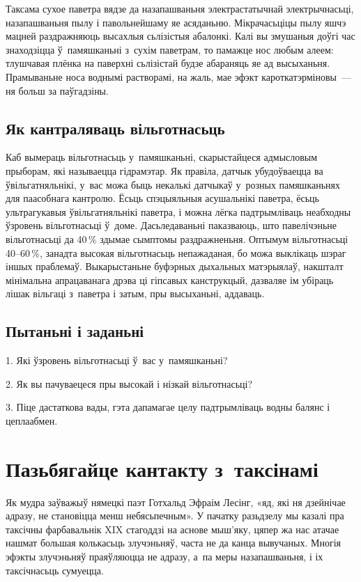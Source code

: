Таксама сухое паветра вядзе да назапашваньня электрастатычнай электрычнасьці, назапашваньня пылу і павольнейшаму яе асяданьню. Мікрачасьціцы пылу яшчэ мацней раздражняюць высахлыя сьлізістыя абалонкі. Калі вы змушаныя доўгі час знаходзіцца ў~памяшканьні з~сухім паветрам, то памажце нос любым алеем: тлушчавая плёнка на паверхні сьлізістай будзе абараняць яе ад высыханьня. Прамываньне носа воднымі растворамі, на жаль, мае эфэкт кароткатэрміновы~--- ня больш за паўгадзіны.

\subsection*{Як кантраляваць вільготнасьць}

Каб вымераць вільготнасьць у~памяшканьні, скарыстайцеся адмысловым прыборам, які называецца гідрамэтар. Як правіла, датчык убудоўваецца ва ўвільгатняльнікі, у~вас можа быць некалькі датчыкаў у~розных памяшканьнях для паасобнага кантролю. Ёсьць спэцыяльныя асушальнікі паветра, ёсьць ультрагукавыя ўвільгатняльнікі паветра, і можна лёгка падтрымліваць неабходны ўзровень вільготнасьці ў~доме. Дасьледаваньні паказваюць, што павелічэньне вільготнасьці да 40\,\% здымае сымптомы раздражненьня. Оптымум вільготнасьці 40--60\,\%, занадта высокая вільготнасьць непажаданая, бо можа выклікаць шэраг іншых праблемаў. Выкарыстаньне буфэрных дыхальных матэрыялаў, накшталт мінімальна апрацаванага дрэва ці гіпсавых канструкцый, дазваляе ім убіраць лішак вільгаці з~паветра і затым, пры высыханьні, аддаваць.

\subsection*{Пытаньні і заданьні}

1. Які ўзровень вільготнасьці ў~вас у~памяшканьні?

2. Як вы пачуваецеся пры высокай і нізкай вільготнасьці?

3. Піце дастаткова вады, гэта дапамагае целу падтрымліваць водны балянс і цеплаабмен.


\section{Пазьбягайце кантакту з~таксінамі}

Як мудра заўважыў нямецкі паэт Готхальд Эфраім Лесінг, «яд, які ня дзейнічае адразу, не становіцца менш небясьпечным». У пачатку разьдзелу мы казалі пра таксічны фарбавальнік XIX стагоддзі на аснове мыш'яку, цяпер жа нас атачае нашмат большая колькасьць злучэньняў, часта не да канца вывучаных. Многія эфэкты злучэньняў праяўляюцца не адразу, а~па меры назапашваньня, і іх таксічнасьць сумуецца.

